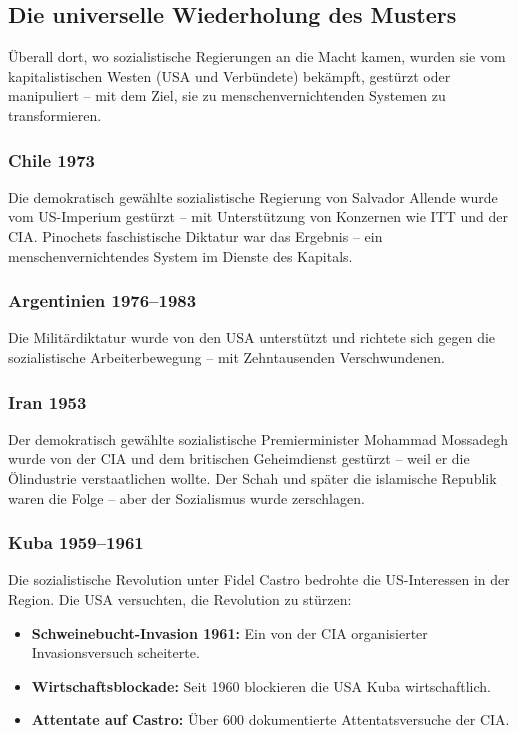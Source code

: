 \subsection{Die universelle Wiederholung des Musters}

Überall dort, wo sozialistische Regierungen an die Macht kamen, wurden sie vom kapitalistischen Westen (USA und Verbündete) bekämpft, gestürzt oder manipuliert – mit dem Ziel, sie zu menschenvernichtenden Systemen zu transformieren.

\subsubsection{Chile 1973}

Die demokratisch gewählte sozialistische Regierung von Salvador Allende wurde vom US-Imperium gestürzt – mit Unterstützung von Konzernen wie ITT und der CIA. Pinochets faschistische Diktatur war das Ergebnis – ein menschenvernichtendes System im Dienste des Kapitals.

\subsubsection{Argentinien 1976–1983}

Die Militärdiktatur wurde von den USA unterstützt und richtete sich gegen die sozialistische Arbeiterbewegung – mit Zehntausenden Verschwundenen.

\subsubsection{Iran 1953}

Der demokratisch gewählte sozialistische Premierminister Mohammad Mossadegh wurde von der CIA und dem britischen Geheimdienst gestürzt – weil er die Ölindustrie verstaatlichen wollte. Der Schah und später die islamische Republik waren die Folge – aber der Sozialismus wurde zerschlagen.

\subsubsection{Kuba 1959–1961}

Die sozialistische Revolution unter Fidel Castro bedrohte die US-Interessen in der Region. Die USA versuchten, die Revolution zu stürzen:

\begin{itemize}
    \item \textbf{Schweinebucht-Invasion 1961:} Ein von der CIA organisierter Invasionsversuch scheiterte.
    \item \textbf{Wirtschaftsblockade:} Seit 1960 blockieren die USA Kuba wirtschaftlich.
    \item \textbf{Attentate auf Castro:} Über 600 dokumentierte Attentatsversuche der CIA.
\end{itemize}

